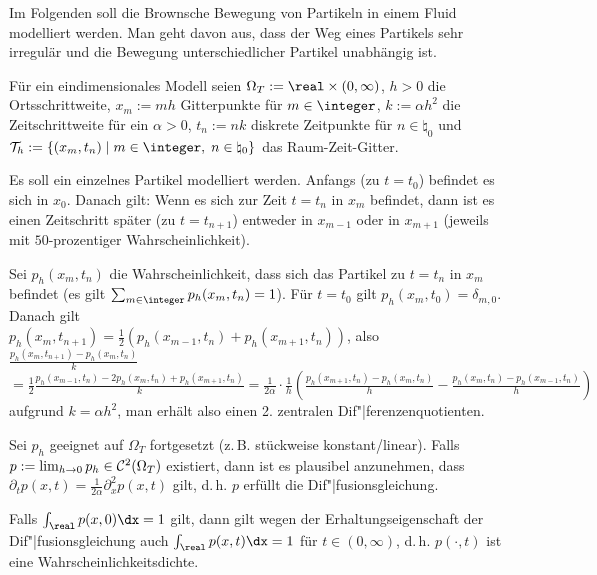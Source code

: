 \begin{Bsp}
    Im Folgenden soll die Brownsche Bewegung von Partikeln in einem Fluid modelliert werden.
    Man geht davon aus, dass der Weg eines Partikels sehr irregulär und die Bewegung
    unterschiedlicher Partikel unabhängig ist.

    Für ein eindimensionales Modell seien $\Omega_T := \real \times (0, \infty)$,
    $h > 0$ die Ortsschrittweite,
    $x_m := mh$ Gitterpunkte für $m \in \integer$,
    $k := \alpha h^2$ die Zeitschrittweite für ein $\alpha > 0$,
    $t_n := nk$ diskrete Zeitpunkte für $n \in \natural_0$ und
    $\T_h := \{(x_m, t_n) \;|\; m \in \integer,\; n \in \natural_0\}$ das Raum-Zeit-Gitter.

    Es soll ein einzelnes Partikel modelliert werden.
    Anfangs (zu $t = t_0$) befindet es sich in $x_0$.
    Danach gilt:
    Wenn es sich zur Zeit $t = t_n$ in $x_m$ befindet, dann ist es einen Zeitschritt später
    (zu $t = t_{n+1}$) entweder in $x_{m-1}$ oder in $x_{m+1}$
    (jeweils mit $50$-prozentiger Wahrscheinlichkeit).

    Sei $p_h(x_m, t_n)$ die Wahrscheinlichkeit, dass sich das Partikel zu $t = t_n$ in $x_m$
    befindet (es gilt $\sum_{m \in \integer} p_h(x_m, t_n) = 1$).
    Für $t = t_0$ gilt $p_h(x_m, t_0) = \delta_{m,0}$.
    Danach gilt\\
    $p_h(x_m, t_{n+1}) = \frac{1}{2} (p_h(x_{m-1}, t_n) + p_h(x_{m+1}, t_n))$, also
    $\frac{p_h(x_m, t_{n+1}) - p_h(x_m, t_n)}{k}$\\
    $= \frac{1}{2} \frac{p_h(x_{m-1}, t_n) - 2p_h(x_m, t_n) + p_h(x_{m+1}, t_n)}{k}
    = \frac{1}{2\alpha} \cdot \frac{1}{h}
    \left(\frac{p_h(x_{m+1}, t_n) - p_h(x_m, t_n)}{h} -
    \frac{p_h(x_m, t_n) - p_h(x_{m-1}, t_n)}{h}\right)$
    aufgrund $k = \alpha h^2$,
    man erhält also einen 2. zentralen Dif"|ferenzenquotienten.

    Sei $p_h$ geeignet auf $\Omega_T$ fortgesetzt
    (z.\,B. stückweise konstant/linear).
    Falls\\
    $p := \lim_{h \to 0} p_h \in \mathcal{C}^2(\Omega_T)$ existiert, dann ist es plausibel
    anzunehmen, dass $\partial_t p(x, t) = \frac{1}{2\alpha} \partial_x^2 p(x, t)$ gilt,
    d.\,h. $p$ erfüllt die Dif"|fusionsgleichung.

    Falls $\int_\real p(x, 0)\dx = 1$ gilt, dann gilt wegen der Erhaltungseigenschaft der
    Dif"|fusionsgleichung auch $\int_\real p(x, t)\dx = 1$ für $t \in (0, \infty)$, d.\,h.
    $p(\cdot, t)$ ist eine Wahrscheinlichkeitsdichte.
\end{Bsp}

\pagebreak
